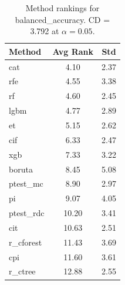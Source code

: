 \begin{table}[h]
\centering
\caption{Method rankings for balanced_accuracy. CD = 3.792 at $\alpha=0.05$.}
\label{tab:ranks_balanced_accuracy}
\begin{tabular}{lcc}
\toprule
Method & Avg Rank & Std \\
\midrule
cat & 4.10 & 2.37 \\
rfe & 4.55 & 3.38 \\
rf & 4.60 & 2.45 \\
lgbm & 4.77 & 2.89 \\
et & 5.15 & 2.62 \\
cif & 6.33 & 2.47 \\
xgb & 7.33 & 3.22 \\
boruta & 8.45 & 5.08 \\
ptest_mc & 8.90 & 2.97 \\
pi & 9.07 & 4.05 \\
ptest_rdc & 10.20 & 3.41 \\
cit & 10.63 & 2.51 \\
r_cforest & 11.43 & 3.69 \\
cpi & 11.60 & 3.61 \\
r_ctree & 12.88 & 2.55 \\
\bottomrule
\end{tabular}
\end{table}
